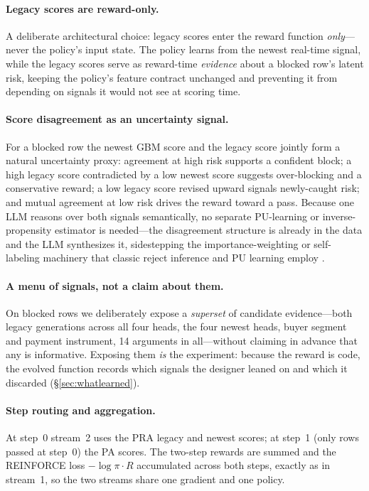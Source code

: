 \documentclass[11pt]{article}
\begin{document}
\paragraph{Legacy scores are reward-only.}
A deliberate architectural choice: legacy scores enter the reward function \emph{only}---never
the policy's input state. The policy learns from the newest real-time signal, while the legacy
scores serve as reward-time \emph{evidence} about a blocked row's latent risk, keeping the
policy's feature contract unchanged and preventing it from depending on signals it
would not see at scoring time.

\paragraph{Score disagreement as an uncertainty signal.}
For a blocked row the newest GBM score and the legacy score jointly form a natural
uncertainty proxy: agreement at high risk supports a confident block; a high legacy score
contradicted by a low newest score suggests over-blocking and a conservative reward; a low
legacy score revised upward signals newly-caught risk; and mutual agreement at low risk
drives the reward toward a pass. Because one LLM reasons over both signals semantically, no
separate PU-learning or inverse-propensity estimator is needed---the disagreement structure
is already in the data and the LLM synthesizes it, sidestepping the importance-weighting or
self-labeling machinery that classic reject inference and PU learning employ
\cite{elkan2008learning,kozodoi2020shallow,liu2022rmt}.

\paragraph{A menu of signals, not a claim about them.}
On blocked rows we deliberately expose a \emph{superset} of candidate evidence---both legacy
generations across all four heads, the four newest heads, buyer segment and payment instrument, 14
arguments in all---without claiming in advance that any is informative. Exposing them \emph{is}
the experiment: because the reward is code, the evolved function records which signals the designer
leaned on and which it discarded (\S\ref{sec:whatlearned}).

\paragraph{Step routing and aggregation.}
At step~0 stream~2 uses the PRA legacy and newest scores; at step~1 (only rows passed at
step~0) the PA scores. The two-step rewards are summed and the REINFORCE loss
$-\log\pi \cdot R$ accumulated across both steps, exactly as in stream~1, so the two streams
share one gradient and one policy.
\end{document}
